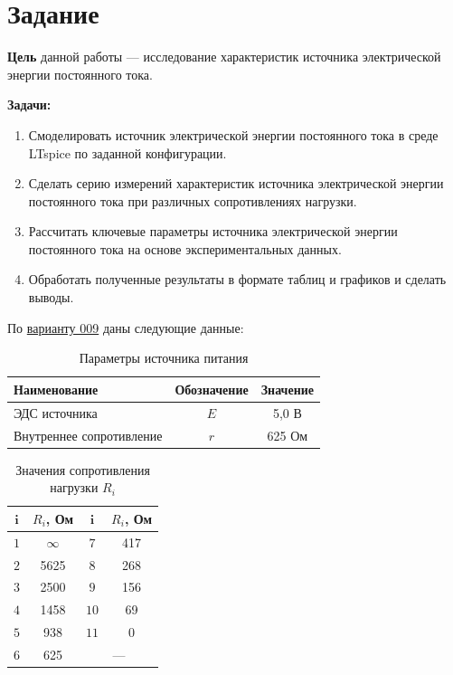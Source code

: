 \section{Задание}

\textbf{Цель} данной работы — исследование характеристик источника электрической энергии постоянного тока.

\textbf{Задачи:}
\begin{enumerate}
    \item Смоделировать источник электрической энергии постоянного тока в среде LTspice по заданной конфигурации.
    \item Сделать серию измерений характеристик источника электрической энергии постоянного тока при различных сопротивлениях нагрузки.
    \item Рассчитать ключевые параметры источника электрической энергии постоянного тока на основе экспериментальных данных.
    \item Обработать полученные результаты в формате таблиц и графиков и сделать выводы.
\end{enumerate}

По \underline{варианту 009} даны следующие данные:

\begin{table}[H]
\centering
\label{tab:source_params}
\begin{tabular}{|l|c|c|}
\hline
\textbf{Наименование} & \textbf{Обозначение} & \textbf{Значение} \\ \hline
ЭДС источника & $E$ & 5,0 В \\ \hline
Внутреннее сопротивление & $r$ & 625 Ом \\ \hline
\end{tabular}
\caption{Параметры источника питания}
\end{table}

\begin{table}[h!]
\centering
\label{tab:load_params}
\begin{tabular}{|c|c||c|c|}
\hline
$\boldsymbol{i}$ & \textbf{$R_i$, Ом} & $\boldsymbol{i}$ & \textbf{$R_i$, Ом} \\ \hline
$1$ & $\infty$ & $7$ & 417 \\ \hline
$2$ & 5625     & $8$ & 268 \\ \hline
$3$ & 2500     & $9$ & 156 \\ \hline
$4$ & 1458     & $10$ & 69 \\ \hline
$5$ & 938      & $11$ & 0  \\ \hline
$6$ & 625      & \multicolumn{2}{c|}{—} \\ \hline
\end{tabular}
\caption{Значения сопротивления нагрузки $R_i$}
\end{table}